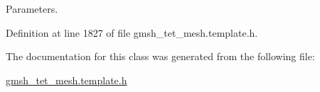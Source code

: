 Parameters. 



Definition at line 1827 of file gmsh\+\_\+tet\+\_\+mesh.\+template.\+h.



The documentation for this class was generated from the following file\+:\begin{DoxyCompactItemize}
\item 
\hyperlink{gmsh__tet__mesh_8template_8h}{gmsh\+\_\+tet\+\_\+mesh.\+template.\+h}\end{DoxyCompactItemize}
